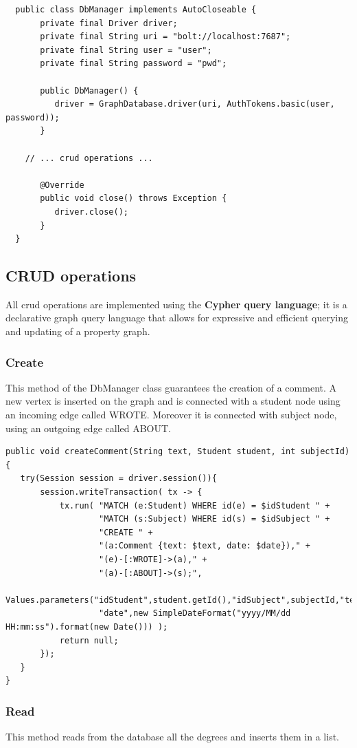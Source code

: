 \documentclass[a4paper]{article}
\begin{document}
\begin{verbatim}
  public class DbManager implements AutoCloseable {
       private final Driver driver;
       private final String uri = "bolt://localhost:7687";
       private final String user = "user";
       private final String password = "pwd";

       public DbManager() {
          driver = GraphDatabase.driver(uri, AuthTokens.basic(user, password));
       }

    // ... crud operations ...

       @Override
       public void close() throws Exception {
          driver.close();
       }
  }
\end{verbatim}


\subsection{CRUD operations}
All crud operations are implemented using the \textbf{Cypher query language}; it is a declarative graph query language that allows for expressive and efficient querying and updating of a property graph.


\subsubsection{Create}
This method of the DbManager class guarantees the creation of a comment. A new vertex is inserted on the graph and  is connected with a student node using an incoming edge called WROTE. Moreover it is connected with subject node, using an outgoing edge called ABOUT.

\begin{verbatim}
public void createComment(String text, Student student, int subjectId) {
   try(Session session = driver.session()){
       session.writeTransaction( tx -> {
           tx.run( "MATCH (e:Student) WHERE id(e) = $idStudent " + 
                   "MATCH (s:Subject) WHERE id(s) = $idSubject " +
                   "CREATE " + 
                   "(a:Comment {text: $text, date: $date})," + 
                   "(e)-[:WROTE]->(a)," + 
                   "(a)-[:ABOUT]->(s);", 
             Values.parameters("idStudent",student.getId(),"idSubject",subjectId,"text",text,
                   "date",new SimpleDateFormat("yyyy/MM/dd HH:mm:ss").format(new Date())) );
           return null;
       });
   }
}
\end{verbatim}


\subsubsection{Read}
This method reads from the database all the degrees and inserts them in a list.
\end{document}
